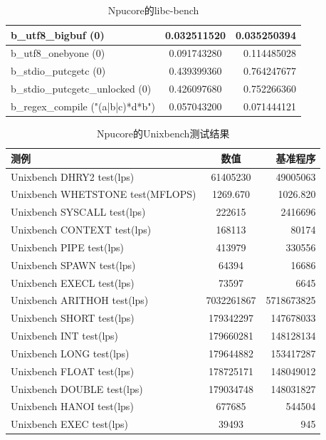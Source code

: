 \begin{table}[H]
\begin{tabular}{|l|c|r|}
        \hline
        b\_utf8\_bigbuf (0) & 0.032511520 &0.035250394\\
        \hline
        b\_utf8\_onebyone (0) & 0.091743280 &0.114485028\\
        \hline
        b\_stdio\_putcgetc (0) & 0.439399360 &0.764247677\\
        \hline
        b\_stdio\_putcgetc\_unlocked (0) & 0.426097680 &0.752266360\\
        \hline
        b\_regex\_compile ("(a|b|c)*d*b") & 0.057043200 &0.071444121\\
        \hline
    \end{tabular}
    \caption{Npucore的libc-bench}
\end{table}

\begin{table}[H]
    \centering
    \begin{tabular}{|l|c|r|}
        \hline
        \textbf{测例} & \textbf{数值} &\textbf{基准程序}\\
        \hline
        Unixbench DHRY2 test(lps) & 61405230 &49005063\\
        \hline
        Unixbench WHETSTONE test(MFLOPS) & 1269.670 &1026.820\\
        \hline
        Unixbench SYSCALL test(lps) & 222615 &2416696\\
        \hline
        Unixbench CONTEXT test(lps) & 168113 &80174\\
        \hline
        Unixbench PIPE test(lps) & 413979 &330556\\
        \hline
        Unixbench SPAWN test(lps) & 64394 &16686\\
        \hline
        Unixbench EXECL test(lps) & 73597 &6645\\
        \hline
        Unixbench ARITHOH test(lps) & 7032261867 &5718673825\\
        \hline
        Unixbench SHORT test(lps) & 179342297 &147678033\\
        \hline
        Unixbench INT test(lps) & 179660281 &148128134\\
        \hline
        Unixbench LONG test(lps) & 179644882 &153417287\\
        \hline
        Unixbench FLOAT test(lps) & 178725171 &148049012\\
        \hline
        Unixbench DOUBLE test(lps) & 179034748 &148031827\\
        \hline
        Unixbench HANOI test(lps) & 677685 &544504\\
        \hline
        Unixbench EXEC test(lps) & 39493 &945\\
        \hline
    \end{tabular}
    \caption{Npucore的Unixbench测试结果}
    \label{Npucore的Unixbench测试结果}
\end{table}


